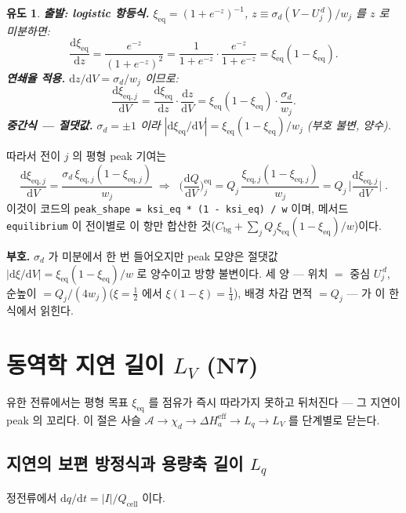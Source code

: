 \documentclass[11pt,a4paper]{article}
\newtheorem*{derivebox}{유도}
\newcommand{\dd}{\mathrm{d}}
\newcommand{\eff}{\mathrm{eff}}
\newcommand{\eq}{\mathrm{eq}}
\newcommand{\cell}{\mathrm{cell}}
\newcommand{\bg}{\mathrm{bg}}
\newcommand{\code}[1]{\texttt{#1}}
\begin{document}
\begin{derivebox}
\textbf{출발: logistic 항등식.} $\xi_\eq=(1+e^{-z})^{-1}$, $z\equiv\sigma_d(V-U_j^{\,d})/w_j$ 를 $z$ 로 미분하면:
\begin{equation*}
\frac{\dd\xi_\eq}{\dd z}=\frac{e^{-z}}{(1+e^{-z})^2}=\frac{1}{1+e^{-z}}\cdot\frac{e^{-z}}{1+e^{-z}}=\xi_\eq(1-\xi_\eq).
\end{equation*}
\textbf{연쇄율 적용.} $\dd z/\dd V=\sigma_d/w_j$ 이므로:
\begin{equation*}
\frac{\dd\xi_{\eq,j}}{\dd V}=\frac{\dd\xi_\eq}{\dd z}\cdot\frac{\dd z}{\dd V}=\xi_\eq(1-\xi_\eq)\cdot\frac{\sigma_d}{w_j}.
\end{equation*}
\textbf{중간식 — 절댓값.} $\sigma_d=\pm1$ 이라 $|\dd\xi_\eq/\dd V|=\xi_\eq(1-\xi_\eq)/w_j$ (부호 불변, 양수).
\end{derivebox}

따라서 전이 $j$ 의 평형 peak 기여는
\begin{equation}
\frac{\dd\xi_{\eq,j}}{\dd V}=\frac{\sigma_d\,\xi_{\eq,j}(1-\xi_{\eq,j})}{w_j}
\;\Longrightarrow\;
\boxed{\;\Big(\frac{\dd Q}{\dd V}\Big)^\eq_j
=Q_j\,\frac{\xi_{\eq,j}(1-\xi_{\eq,j})}{w_j}
=Q_j\,\Big|\frac{\dd\xi_{\eq,j}}{\dd V}\Big|\;.}
\label{eq:eqpeak}
\end{equation}
이것이 코드의 \code{peak\_shape = ksi\_eq * (1 - ksi\_eq) / w} 이며, 메서드 \code{equilibrium} 이 전이별로 이 항만
합산한 것($C_\bg+\sum_jQ_j\xi_\eq(1-\xi_\eq)/w$)이다.

\textbf{부호.} $\sigma_d$ 가 미분에서 한 번 들어오지만 peak 모양은
절댓값 $|\dd\xi/\dd V|=\xi_\eq(1-\xi_\eq)/w$ 로 양수이고 방향 불변이다. 세 양 — 위치 $=$ 중심
$U_j^{\,d}$, 순높이 $=Q_j/(4w_j)$($\xi=\tfrac12$ 에서 $\xi(1-\xi)=\tfrac14$), 배경 차감 면적 $=Q_j$ —
가 이 한 식에서 읽힌다.

\section{동역학 지연 길이 $L_V$ (N7)}\label{sec:lag}
유한 전류에서는 평형 목표 $\xi_\eq$ 를 점유가 즉시 따라가지 못하고 뒤처진다 — 그 지연이 peak 의 꼬리다.
이 절은 사슬 $\mathcal A\to\chi_d\to\Delta H_a^\eff\to L_q\to L_V$ 를 단계별로 닫는다.

\subsection{지연의 보편 방정식과 용량축 길이 $L_q$}
정전류에서 $\dd q/\dd t=|I|/Q_\cell$ 이다.
\end{document}
